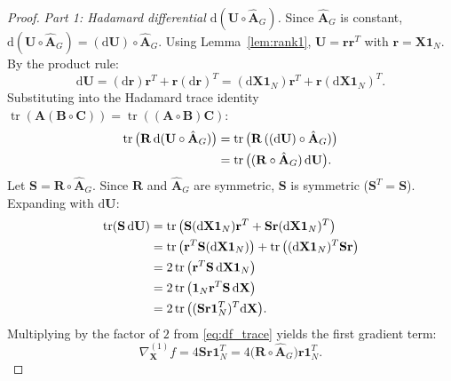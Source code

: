 \documentclass[conference]{IEEEtran}
\begin{document}
\begin{proof}
\textit{Part 1: Hadamard differential $\mathrm{d}(\mathbf{U} \circ \hat{\mathbf{A}}_G)$.} Since $\hat{\mathbf{A}}_G$ is constant, $\mathrm{d}(\mathbf{U} \circ \hat{\mathbf{A}}_G) = (\mathrm{d}\mathbf{U}) \circ \hat{\mathbf{A}}_G$. Using Lemma~\ref{lem:rank1}, $\mathbf{U} = \mathbf{r}\mathbf{r}^T$ with $\mathbf{r} = \mathbf{X}\mathbf{1}_N$. By the product rule:
\begin{equation}
\mathrm{d}\mathbf{U} = (\mathrm{d}\mathbf{r})\mathbf{r}^T + \mathbf{r}(\mathrm{d}\mathbf{r})^T = (\mathrm{d}\mathbf{X}\mathbf{1}_N)\mathbf{r}^T + \mathbf{r}(\mathrm{d}\mathbf{X}\mathbf{1}_N)^T.
\end{equation}
Substituting into the Hadamard trace identity $\operatorname{tr}(\mathbf{A}(\mathbf{B}\circ\mathbf{C})) = \operatorname{tr}((\mathbf{A}\circ\mathbf{B})\mathbf{C})$:
\begin{align}
\operatorname{tr}\big(\mathbf{R} \, \mathrm{d}(\mathbf{U}\circ\hat{\mathbf{A}}_G)\big) &= \operatorname{tr}\big(\mathbf{R} \, ((\mathrm{d}\mathbf{U})\circ\hat{\mathbf{A}}_G)\big) \notag\\
&= \operatorname{tr}\big((\mathbf{R} \circ \hat{\mathbf{A}}_G) \, \mathrm{d}\mathbf{U}\big).
\end{align}
Let $\mathbf{S} = \mathbf{R} \circ \hat{\mathbf{A}}_G$. Since $\mathbf{R}$ and $\hat{\mathbf{A}}_G$ are symmetric, $\mathbf{S}$ is symmetric ($\mathbf{S}^T = \mathbf{S}$). Expanding with $\mathrm{d}\mathbf{U}$:
\begin{align}
\operatorname{tr}(\mathbf{S} \, \mathrm{d}\mathbf{U}) &= \operatorname{tr}\big(\mathbf{S}(\mathrm{d}\mathbf{X}\mathbf{1}_N)\mathbf{r}^T + \mathbf{S}\mathbf{r}(\mathrm{d}\mathbf{X}\mathbf{1}_N)^T\big) \notag\\
&= \operatorname{tr}\big(\mathbf{r}^T\mathbf{S}(\mathrm{d}\mathbf{X}\mathbf{1}_N)\big) + \operatorname{tr}\big((\mathrm{d}\mathbf{X}\mathbf{1}_N)^T\mathbf{S}\mathbf{r}\big) \notag\\
&= 2\operatorname{tr}\big(\mathbf{r}^T\mathbf{S}\,\mathrm{d}\mathbf{X}\mathbf{1}_N\big) \notag\\
&= 2\operatorname{tr}\big(\mathbf{1}_N\mathbf{r}^T\mathbf{S}\,\mathrm{d}\mathbf{X}\big) \notag\\
&= 2\operatorname{tr}\big((\mathbf{S}\mathbf{r}\mathbf{1}_N^T)^T \mathrm{d}\mathbf{X}\big).
\end{align}
Multiplying by the factor of $2$ from \eqref{eq:df_trace} yields the first gradient term:
\begin{equation}
\nabla_{\mathbf{X}}^{(1)} f = 4\mathbf{S}\mathbf{r}\mathbf{1}_N^T = 4\big(\mathbf{R} \circ \hat{\mathbf{A}}_G\big)\mathbf{r}\mathbf{1}_N^T.
\end{equation}


\end{proof}
\end{document}
